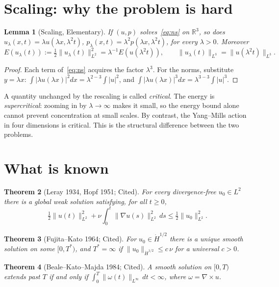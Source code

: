 \documentclass[11pt]{article}
\newtheorem{theorem}{Theorem}[section]
\newtheorem{lemma}[theorem]{Lemma}
\theoremstyle{definition}
\theoremstyle{remark}
\newcommand{\R}{\mathbb{R}}
\begin{document}
\section{Scaling: why the problem is hard}

\begin{lemma}[Scaling, Elementary]\label{lem:scaling}
If $(u,p)$ solves~\eqref{eq:ns} on $\R^3$, so does
$u_\lambda(x,t)=\lambda u(\lambda x,\lambda^2 t)$,
$p_\lambda(x,t)=\lambda^2 p(\lambda x,\lambda^2 t)$, for every $\lambda>0$.
Moreover
\[
E(u_\lambda(t)) := \tfrac12\|u_\lambda(t)\|_{L^2}^2
= \lambda^{-1} E(u(\lambda^2 t)), \qquad
\|u_\lambda(t)\|_{L^3} = \|u(\lambda^2 t)\|_{L^3}.
\]
\end{lemma}
\begin{proof}
Each term of~\eqref{eq:ns} acquires the factor $\lambda^3$. For the norms,
substitute $y=\lambda x$: $\int|\lambda u(\lambda x)|^2dx=\lambda^{2-3}\int|u|^2$,
and $\int|\lambda u(\lambda x)|^3dx=\lambda^{3-3}\int|u|^3$.
\end{proof}

A quantity unchanged by the rescaling is called \emph{critical}. The energy
is \emph{supercritical}: zooming in by $\lambda\to\infty$ makes it small, so
the energy bound alone cannot prevent concentration at small scales. By
contrast, the Yang--Mills action in four dimensions is critical. This is the
structural difference between the two problems.

\section{What is known}

\begin{theorem}[Leray 1934, Hopf 1951; Cited]
For every divergence-free $u_0\in L^2$ there is a global weak solution
satisfying, for all $t\ge0$,
\[
\tfrac12\|u(t)\|_{L^2}^2 + \nu\int_0^t\|\nabla u(s)\|_{L^2}^2\,ds
\le \tfrac12\|u_0\|_{L^2}^2 .
\]
\end{theorem}

\begin{theorem}[Fujita--Kato 1964; Cited]
For $u_0\in\dot H^{1/2}$ there is a unique smooth solution on some
$[0,T^*)$, and $T^*=\infty$ if $\|u_0\|_{\dot H^{1/2}}\le c\,\nu$ for a
universal $c>0$.
\end{theorem}

\begin{theorem}[Beale--Kato--Majda 1984; Cited]
A smooth solution on $[0,T)$ extends past $T$ if and only if
$\int_0^T\|\omega(t)\|_{L^\infty}\,dt<\infty$, where $\omega=\nabla\times u$.
\end{theorem}
\end{document}
